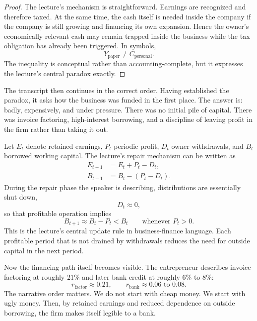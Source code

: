 \begin{proof}
The lecture's mechanism is straightforward. Earnings are recognized and therefore taxed. At the same time, the cash itself is needed inside the company if the company is still growing and financing its own expansion. Hence the owner's economically relevant cash may remain trapped inside the business while the tax obligation has already been triggered. In symbols,
\[
Y_{\text{paper}} \neq C_{\text{personal}}.
\]
The inequality is conceptual rather than accounting-complete, but it expresses the lecture's central paradox exactly.
\end{proof}

The transcript then continues in the correct order. Having established the paradox, it asks how the business was funded in the first place. The answer is: badly, expensively, and under pressure. There was no initial pile of capital. There was invoice factoring, high-interest borrowing, and a discipline of leaving profit in the firm rather than taking it out.

Let \(E_t\) denote retained earnings, \(P_t\) periodic profit, \(D_t\) owner withdrawals, and \(B_t\) borrowed working capital. The lecture's repair mechanism can be written as
\begin{align}
E_{t+1} &= E_t + P_t - D_t,\\
B_{t+1} &= B_t - (P_t - D_t).
\end{align}
During the repair phase the speaker is describing, distributions are essentially shut down,
\begin{equation}
D_t \approx 0,
\end{equation}
so that profitable operation implies
\begin{equation}
B_{t+1} \approx B_t - P_t < B_t
\qquad \text{whenever } P_t>0.
\end{equation}
This is the lecture's central update rule in business-finance language. Each profitable period that is not drained by withdrawals reduces the need for outside capital in the next period.

Now the financing path itself becomes visible. The entrepreneur describes invoice factoring at roughly \(21\%\) and later bank credit at roughly \(6\%\) to \(8\%\):
\begin{equation}
r_{\text{factor}} \approx 0.21,\qquad r_{\text{bank}} \approx 0.06 \text{ to } 0.08.
\end{equation}
The narrative order matters. We do not start with cheap money. We start with ugly money. Then, by retained earnings and reduced dependence on outside borrowing, the firm makes itself legible to a bank.


